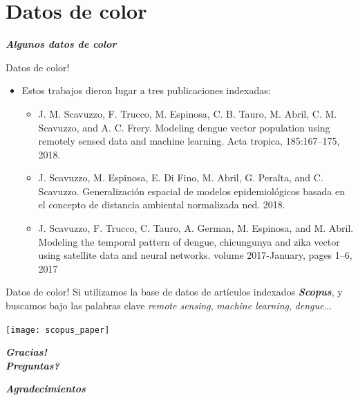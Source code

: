 \documentclass[10pt]{beamer}
\newcommand\IncrFont{\fontsize{20}{20}\selectfont}
\begin{document}
\section{Datos de color}


\begin{frame}{}
  \IncrFont
  \begin{center}
    \textit{\textbf{Algunos datos de color}}
  \end{center}
\end{frame}


\begin{frame}{Datos de color!}
  \begin{itemize}[<+->]
    \item Estos trabajos dieron lugar a tres publicaciones indexadas:
    \begin{itemize}
      \item J. M. Scavuzzo, F. Trucco, M. Espinosa, C. B. Tauro, M. Abril, C. M. Scavuzzo, and
      A. C. Frery. Modeling dengue vector population using remotely sensed data and machine
      learning. Acta tropica, 185:167–175, 2018.
      \item J. Scavuzzo, M. Espinosa, E. Di Fino, M. Abril, G. Peralta, and C. Scavuzzo.
      Generalización espacial de modelos epidemiológicos basada en el concepto de distancia ambiental
      normalizada ned. 2018.
      \item J. Scavuzzo, F. Trucco, C. Tauro, A. German, M. Espinosa, and M. Abril. Modeling
      the temporal pattern of dengue, chicungunya and zika vector using satellite data and
      neural networks. volume 2017-January, pages 1–6, 2017
    \end{itemize}
  \end{itemize}
\end{frame}




\begin{frame}{Datos de color!}
Si utilizamos la base de datos de artículos indexados \textit{\textbf{Scopus}},
y buscamos bajo las palabras clave \textit{remote sensing}, \textit{machine learning}, \textit{dengue}...
  \begin{center}
    \texttt{[image: scopus\_paper]}
  \end{center}

\end{frame}


\begin{frame}{}
  \IncrFont
  \begin{center}
    \textit{\textbf{Gracias! \\ Preguntas?}}
  \end{center}
\end{frame}


\begin{frame}{}
  \IncrFont
  \begin{center}
    \textit{\textbf{Agradecimientos}}
  \end{center}
\end{frame}







\appendix
\end{document}
